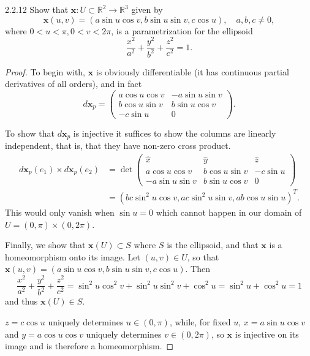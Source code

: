 \documentclass[11pt]{article}
\begin{document}
\begin{problem}{2.2.12}
	Show that \( \mathbf{x}: U \subset \mathbb{R}^2 \rightarrow \mathbb{R}^3 \) given by
	\begin{equation}
		\label{eq:1}
		\mathbf{x}(u,v) = (a\sin u\cos v, b \sin u \sin v, c \cos u), \quad a,b,c \neq 0,
	\end{equation}
	where \( 0 < u < \pi, 0 < v < 2\pi \), is a parametrization for the ellipsoid
	\begin{equation}
		\label{eq:2}
		\frac{x^2}{a^2} + \frac{y^2}{b^2} + \frac{z^2}{c^2} = 1.
	\end{equation}
\end{problem}
\begin{proof}
	To begin with, \( \mathbf{x} \) is obviously differentiable (it has continuous partial derivatives of all orders), and in fact
	\begin{equation}
		\label{eq:7}
		d \mathbf{x}_p = \begin{pmatrix}
			a\cos  u \cos  v  & -a \sin  u \sin  v \\
			b \cos  u \sin  v & b \sin  u \cos  v  \\
			-c \sin  u        & 0
		\end{pmatrix}.
	\end{equation}

  To show that \( d \mathbf{x}_p \) is injective it suffices to show the columns are linearly independent, that is, that they have non-zero cross product.
  \begin{align}
  \label{eq:10}
  d \mathbf{x}_p(e_1) \times d \mathbf{x}_p(e_2) &= \det \begin{pmatrix}
\hat{x}             & \hat{y} & \hat{z} \\
a \cos  u \cos  v   & b \cos  u \sin  v & -c \sin  u \\
-a \sin  u \sin  v  & b \sin  u \cos  v & 0
  \end{pmatrix} \\
  &= \left( bc \sin^2u \cos v, ac \sin^2 u \sin v, ab \cos u \sin u\right)^{T}.
  \end{align}
  This would only vanish when \( \sin u = 0 \) which cannot happen in our domain of \( U = (0, \pi) \times (0, 2\pi) \).

  Finally, we show that \( \mathbf{x}(U) \subset S \) where \( S \) is the ellipsoid, and that \( \mathbf{x} \) is a homeomorphism onto its image.
  Let \( (u,v) \in U \), so that \( \mathbf{x}(u,v) = (a\sin u \cos v, b \sin u \sin v, c \cos u) \).
  Then
  \begin{equation}
  \label{eq:11}
   \frac{x^2}{a^2} + \frac{y^2}{b^2} + \frac{z^2}{c^2} = \sin^2 u \cos^2 v + \sin^2 u \sin^2 v + \cos^2 u = \sin^2 u + \cos^2 u = 1
  \end{equation}
  and thus \( \mathbf{x}(U) \in S \).

  \( z = c\cos u \) uniquely determines \( u \in (0, \pi)\), while, for fixed \( u \), \( x= a \sin u \cos v \) and \( y = a\cos u \cos v \) uniquely determines \( v \in (0, 2\pi) \), so \( \mathbf{x} \) is injective on its image and is therefore a homeomorphism.
\end{proof}
\end{document}
